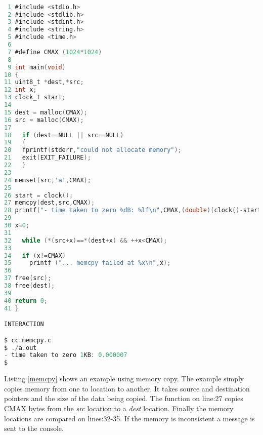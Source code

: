 \begin{lstlisting}[language=C,showstringspaces=false,caption={File: memcpy.c},captionpos=b,label=memcpy]

 1 #include <stdio.h>
 2 #include <stdlib.h>
 3 #include <stdint.h>
 4 #include <string.h>
 5 #include <time.h>
 6 
 7 #define CMAX (1024*1024)
 8 
 9 int main(void)
10 {
11 uint8_t *dest,*src;
12 int x;
13 clock_t start;
14 
15 dest = malloc(CMAX);
16 src = malloc(CMAX);
17 
18   if (dest==NULL || src==NULL)
19   {
20   fprintf(stderr,"could not allocate memory");
21   exit(EXIT_FAILURE);
22   }
23 
24 memset(src,'a',CMAX);
25 
26 start = clock();
27 memcpy(dest,src,CMAX); 
28 printf("- time taken to zero %dB: %lf\n",CMAX,(double)(clock()-start)/CLOCKS_PER_SEC);
29 
30 x=0;
31 
32   while (*(src+x)==*(dest+x) && ++x<CMAX);
33   
34   if (x!=CMAX)
35     printf ("... memcpy failed at %x\n",x);
36 
37 free(src);
38 free(dest);
39 
40 return 0;
41 }

INTERACTION

$ cc memcpy.c
$ ./a.out
- time taken to zero 1KB: 0.000007
$ 

\end{lstlisting}

Listing \ref{memcpy} shows an example using memory copy.  The example simply copies memory from one to location to another. It takes source and destination pointers and the size of the data being copied. The function on line:27 copies CMAX bytes from the \textit{src} location to a \textit{dest} location. Finally the memory locations are compared on lines:32-35. If the memory is inconsistent a message is sent to the console.







